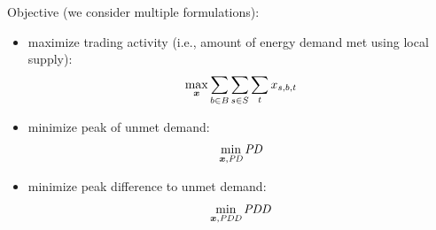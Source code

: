 Objective (we consider multiple formulations):
\begin{itemize}
\item maximize trading activity (i.e., amount of energy demand met using local supply):
\begin{align}
\max_{\boldsymbol{x}} \sum_{b \in B} \sum_{s \in S} \sum_t x_{s,b,t}
\end{align}
\item minimize peak of unmet demand:
\begin{align}
\min_{\boldsymbol{x}, \textit{PD}} \textit{PD}
\end{align}
\item minimize peak difference to  unmet demand:
\begin{align}
\min_{\boldsymbol{x}, \textit{PDD}} \textit{PDD}
\end{align}
\end{itemize}

